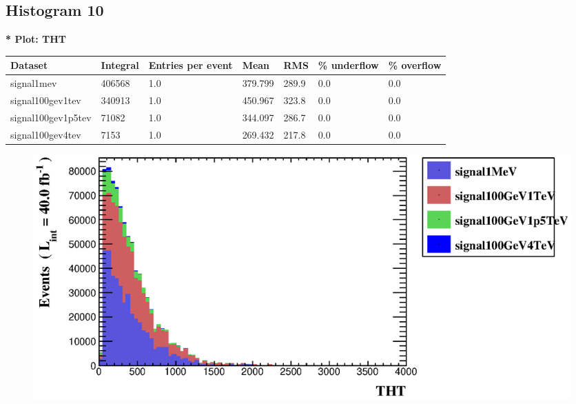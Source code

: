 \documentclass[a4paper, 10pt]{article}
\begin{document}
\subsection{ Histogram 10}

\textbf{* Plot: THT}\\
   \begin{table}[H]
  \begin{center}
    \begin{tabular}{|m{23.0mm}|m{23.0mm}|m{18.0mm}|m{19.0mm}|m{19.0mm}|m{19.0mm}|m{19.0mm}|}
      \hline
      {\cellcolor{yellow}         Dataset}& {\cellcolor{yellow}         Integral}& {\cellcolor{yellow}         Entries per event}& {\cellcolor{yellow}         Mean}& {\cellcolor{yellow}         RMS}& {\cellcolor{yellow}         \% underflow}& {\cellcolor{yellow}         \% overflow}\\
      \hline
      {\cellcolor{white}         signal1mev}& {\cellcolor{white}         406568}& {\cellcolor{white}         1.0}& {\cellcolor{white}         379.799}& {\cellcolor{white}         289.9}& {\cellcolor{green}         0.0}& {\cellcolor{green}         0.0}\\
      \hline
      {\cellcolor{white}         signal100gev1tev}& {\cellcolor{white}         340913}& {\cellcolor{white}         1.0}& {\cellcolor{white}         450.967}& {\cellcolor{white}         323.8}& {\cellcolor{green}         0.0}& {\cellcolor{green}         0.0}\\
      \hline
      {\cellcolor{white}         signal100gev1p5tev}& {\cellcolor{white}         71082}& {\cellcolor{white}         1.0}& {\cellcolor{white}         344.097}& {\cellcolor{white}         286.7}& {\cellcolor{green}         0.0}& {\cellcolor{green}         0.0}\\
      \hline
      {\cellcolor{white}         signal100gev4tev}& {\cellcolor{white}         7153}& {\cellcolor{white}         1.0}& {\cellcolor{white}         269.432}& {\cellcolor{white}         217.8}& {\cellcolor{green}         0.0}& {\cellcolor{green}         0.0}\\
\hline
    \end{tabular}
  \end{center}
\end{table}

\begin{figure}[H]
  \begin{center}
    \includegraphics[scale=0.45]{selection_9.eps}\\
\caption{   }
  \end{center}
\end{figure}
      \newpage
\end{document}
